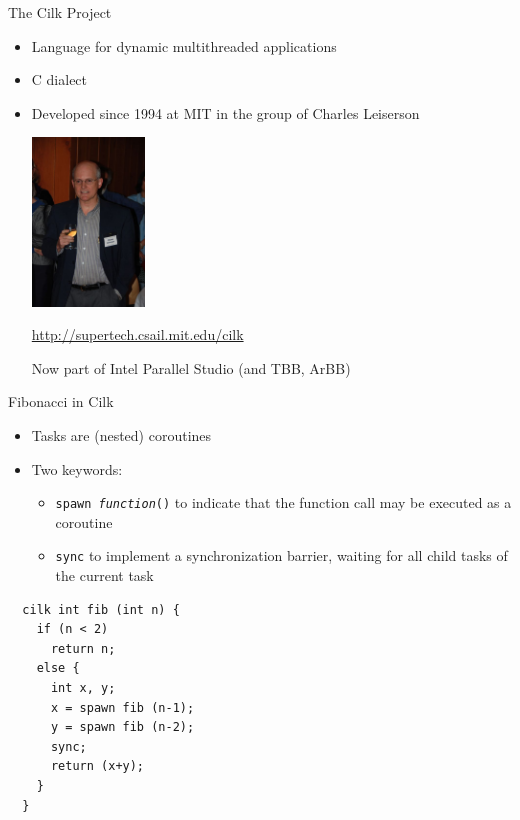 \documentclass[xcolor=dvipsnames,9pt,mathserif]{beamer}
\renewcommand{\emph}[1]{\alert{#1}}
\begin{document}
\begin{frame}{The Cilk Project}
  \begin{itemize}
  \item Language for dynamic multithreaded applications
  \item C dialect
  \item Developed since 1994 at MIT in the group of Charles Leiserson

    \hfill\includegraphics[width=3cm]{leiserson}
    
    \url{http://supertech.csail.mit.edu/cilk}

    Now part of Intel Parallel Studio (and TBB, ArBB)
  \end{itemize}
\end{frame}

\begin{frame}[fragile]{Fibonacci in Cilk}
  \begin{itemize}
  \item Tasks are (nested) coroutines
  \item Two keywords:
    \begin{itemize}
    \item \texttt{spawn \textit{function}()} to indicate that the
      function call \emph{may} be executed as a coroutine
    \item \texttt{sync} to implement a \emph{synchronization barrier},
      waiting for \emph{all child tasks of the current task}
    \end{itemize}
  \end{itemize}

  \bigskip
  \begin{lstlisting}
  cilk int fib (int n) {
    if (n < 2)
      return n;
    else {
      int x, y;
      x = spawn fib (n-1);
      y = spawn fib (n-2);
      sync;
      return (x+y);
    }
  }
  \end{lstlisting}
\end{frame}
\end{document}
